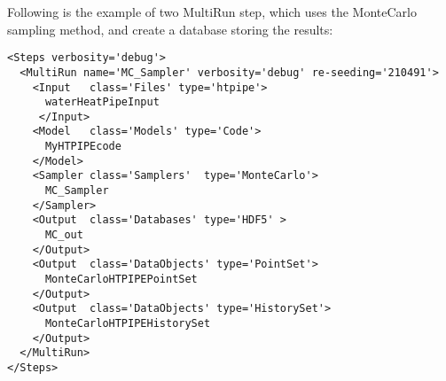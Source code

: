 Following is the example of two MultiRun step, which uses the MonteCarlo sampling
method, and create a database storing the results:
\begin{lstlisting}[style=XML]
<Steps verbosity='debug'>
  <MultiRun name='MC_Sampler' verbosity='debug' re-seeding='210491'>
    <Input   class='Files' type='htpipe'>
      waterHeatPipeInput
     </Input>
    <Model   class='Models' type='Code'>
      MyHTPIPEcode
    </Model>
    <Sampler class='Samplers'  type='MonteCarlo'>
      MC_Sampler
    </Sampler>
    <Output  class='Databases' type='HDF5' >
      MC_out
    </Output>
    <Output  class='DataObjects' type='PointSet'>
      MonteCarloHTPIPEPointSet
    </Output>
    <Output  class='DataObjects' type='HistorySet'>
      MonteCarloHTPIPEHistorySet
    </Output>
  </MultiRun>
</Steps>
\end{lstlisting}

